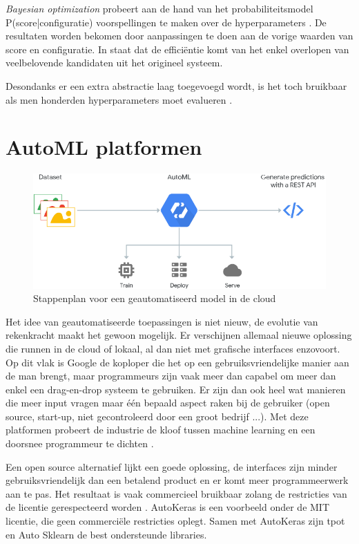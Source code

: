 \textit{Bayesian optimization} probeert aan de hand van het probabiliteitsmodel P(score|configuratie) voorspellingen te maken over de hyperparameters \autocite{Bergstra2013}. De resultaten worden bekomen door aanpassingen te doen aan de vorige waarden van score en configuratie. In \textcite{Bergstra2013} staat dat de efficiëntie komt van het enkel overlopen van veelbelovende kandidaten uit het origineel systeem.

Desondanks er een extra abstractie laag toegevoegd wordt, is het toch bruikbaar als men honderden hyperparameters moet evalueren \autocite{Bergstra2013}.

\section{AutoML platformen}
\label{sec:automl-platformen}

\begin{figure}
    \includegraphics[width=\linewidth]{img/google-cloud-automl.png}
    \caption{Stappenplan voor een geautomatiseerd model in de cloud \autocite{Google2019}}
    \label{fig:google-cloud-automl}
\end{figure}

Het idee van geautomatiseerde toepassingen is niet nieuw, de evolutie van rekenkracht maakt het gewoon mogelijk. Er verschijnen allemaal nieuwe oplossing die runnen in de cloud of lokaal, al dan niet met grafische interfaces enzovoort. Op dit vlak is Google de koploper die het op een gebruiksvriendelijke manier aan de man brengt, maar programmeurs zijn vaak meer dan capabel om meer dan enkel een drag-en-drop systeem te gebruiken. Er zijn dan ook heel wat manieren die meer input vragen maar één bepaald aspect raken bij de gebruiker (open source, start-up, niet gecontroleerd door een groot bedrijf ...). Met deze platformen probeert de industrie de kloof tussen machine learning en een doorsnee programmeur te dichten \autocite{Gutierrez2019}.

Een open source alternatief lijkt een goede oplossing, de interfaces zijn minder gebruiksvriendelijk dan een betalend product en er komt meer programmeerwerk aan te pas. Het resultaat is vaak commercieel bruikbaar zolang de restricties van de licentie gerespecteerd worden \autocite{Balter2015}. AutoKeras is een voorbeeld onder de MIT licentie, die geen commerciële restricties oplegt. Samen met AutoKeras zijn tpot en Auto Sklearn de best ondersteunde libraries.


